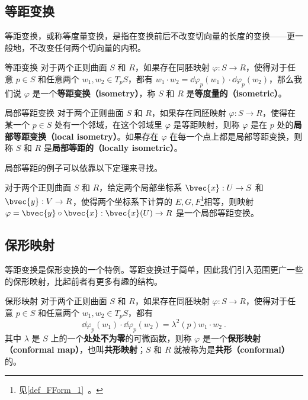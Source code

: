
\subsection{等距变换}
等距变换，或称等度量变换，是指在变换前后不改变切向量的长度的变换——更一般地，不改变任何两个切向量的内积。

\begin{definition}{等距变换}
对于两个正则曲面 $S$ 和 $R$，如果存在同胚映射 $\varphi:S\to R$，使得对于任意 $p\in S$ 和任意两个 $w_1, w_2\in T_pS$，都有 $w_1\cdot w_2=\dd\varphi_p(w_1)\cdot\dd\varphi_p(w_2)$，那么我们说 $\varphi$ 是一个\textbf{等距变换（isometry）}，称 $S$ 和 $R$ 是\textbf{等度量的（isometric）}。
\end{definition}

\begin{definition}{局部等距变换}
对于两个正则曲面 $S$ 和 $R$，如果存在同胚映射 $\varphi:S\to R$，使得在某一个 $p\in S$ 处有一个邻域，在这个邻域里 $\varphi$ 是等距映射，则称 $\varphi$ 是在 $p$ 处的\textbf{局部等距变换（local isometry）}。如果存在 $\varphi$ 在每一个点上都是局部等距变换，则称 $S$ 和 $R$ 是\textbf{局部等距的（locally isometric）}。
\end{definition}

局部等距的例子可以依靠以下定理来寻找。

\begin{theorem}{}
对于两个正则曲面 $S$ 和 $R$，给定两个局部坐标系 $\bvec{x}:U\to S$ 和 $\bvec{y}:V\to R$，使得两个坐标系下计算的 $E, G, F$\footnote{见\autoref{def_FForm_1}~。}相等，则映射 $\varphi=\bvec{y}\circ\bvec{x}:\bvec{x}(U)\to R$ 是一个局部等距变换。
\end{theorem}

\subsection{保形映射}

等距变换是保形变换的一个特例。等距变换过于简单，因此我们引入范围更广一些的保形映射，比起前者有更多有趣的结构。

\begin{definition}{保形映射}
对于两个正则曲面 $S$ 和 $R$，如果存在同胚映射 $\varphi:S\to R$，使得对于任意 $p\in S$ 和任意两个 $w_1, w_2\in T_pS$，都有
\begin{equation}
\dd\varphi_p(w_1)\cdot\dd\varphi_p(w_2)=\lambda^2(p)w_1\cdot w_2~.
\end{equation}
其中 $\lambda$ 是 $S$ 上的一个\textbf{处处不为零}的可微函数，则称 $\varphi$ 是一个\textbf{保形映射（conformal map）}，也叫\textbf{共形映射}；$S$ 和 $R$ 就被称为是\textbf{共形（conformal）}的。
\end{definition}

